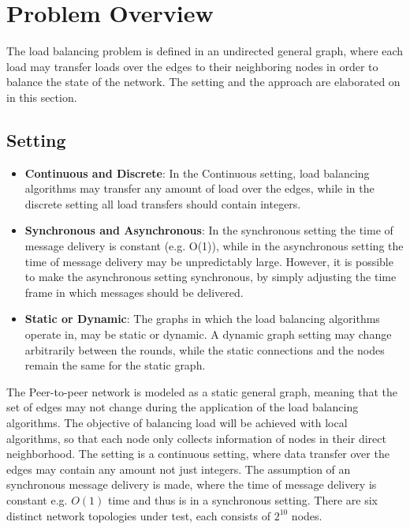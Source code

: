 \chapter{Problem Overview}\label{chap:problemoverview}
The load balancing problem is defined in an undirected general graph, where each load may transfer loads over the edges to their neighboring nodes in order to balance the state of the network. The setting and the approach are elaborated on in this section.

\section{Setting}\label{sec:setting}
\begin{itemize}
    \item \textbf{Continuous and Discrete}: In the Continuous setting, load balancing algorithms may transfer any amount of load over the edges, while in the discrete setting all load transfers should contain integers.
    \item \textbf{Synchronous and Asynchronous}: In the synchronous setting the time of message delivery is constant (e.g. O(1)), while in the asynchronous setting the time of message delivery may be unpredictably large. However, it is possible to make the asynchronous setting synchronous, by simply adjusting the time frame in which messages should be delivered.
    \item \textbf{Static or Dynamic}: The graphs in which the load balancing algorithms operate in, may be static or dynamic. A dynamic graph setting may change arbitrarily between the rounds, while the static connections and the nodes remain the same for the static graph.
\end{itemize}

The Peer-to-peer network is modeled as a static general graph, meaning that the set of edges may not change during the application of the load balancing algorithms. The objective of balancing load will be achieved with local algorithms, so that each node only collects information of nodes in their direct neighborhood. The setting is a continuous setting, where data transfer over the edges may contain any amount not just integers. The assumption of an synchronous message delivery is made, where the time of message delivery is constant e.g. $O(1)$ time and thus is in a synchronous setting. There are six distinct network topologies under test, each consists of $2^{10}$ nodes.

